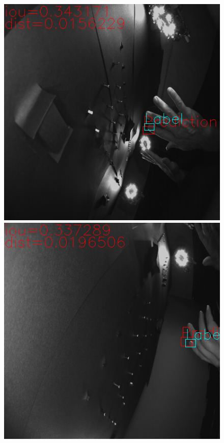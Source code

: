\begin{figure}
	\centering
	\begin{minipage}[b]{0.48\textwidth}	
		\includegraphics[width=\textwidth]{Kapitel/70Resultate/Bilder/2distKnappGut.png}
	\end{minipage}
	\hfill
	\begin{minipage}[b]{0.48\textwidth}		
		\includegraphics[width=\textwidth]{Kapitel/70Resultate/Bilder/5distKnappGut.png}

\end{minipage}
\end{figure}
